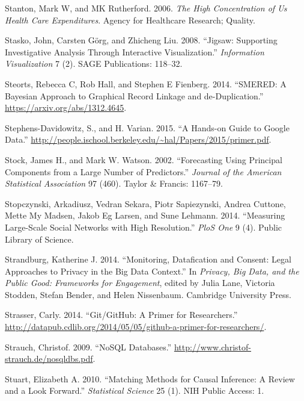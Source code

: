 \documentclass[]{krantz}
\begin{document}
\hypertarget{ref-stanton2006high}{}
Stanton, Mark W, and MK Rutherford. 2006. \emph{The High Concentration
of Us Health Care Expenditures}. Agency for Healthcare Research;
Quality.

\hypertarget{ref-stasko2008jigsaw}{}
Stasko, John, Carsten Görg, and Zhicheng Liu. 2008. ``Jigsaw: Supporting
Investigative Analysis Through Interactive Visualization.''
\emph{Information Visualization} 7 (2). SAGE Publications: 118--32.

\hypertarget{ref-steorts2014smered}{}
Steorts, Rebecca C, Rob Hall, and Stephen E Fienberg. 2014. ``SMERED: A
Bayesian Approach to Graphical Record Linkage and de-Duplication.''
\url{https://arxiv.org/abs/1312.4645}.

\hypertarget{ref-SDV2015}{}
Stephens-Davidowitz, S., and H. Varian. 2015. ``A Hands-on Guide to
Google Data.''
\url{http://people.ischool.berkeley.edu/~hal/Papers/2015/primer.pdf}.

\hypertarget{ref-stock2002forecasting}{}
Stock, James H., and Mark W. Watson. 2002. ``Forecasting Using Principal
Components from a Large Number of Predictors.'' \emph{Journal of the
American Statistical Association} 97 (460). Taylor \& Francis: 1167--79.

\hypertarget{ref-stopczynski2014}{}
Stopczynski, Arkadiusz, Vedran Sekara, Piotr Sapiezynski, Andrea
Cuttone, Mette My Madsen, Jakob Eg Larsen, and Sune Lehmann. 2014.
``Measuring Large-Scale Social Networks with High Resolution.''
\emph{PloS One} 9 (4). Public Library of Science.

\hypertarget{ref-Strandburg2014}{}
Strandburg, Katherine J. 2014. ``Monitoring, Datafication and Consent:
Legal Approaches to Privacy in the Big Data Context.'' In \emph{Privacy,
Big Data, and the Public Good: Frameworks for Engagement}, edited by
Julia Lane, Victoria Stodden, Stefan Bender, and Helen Nissenbaum.
Cambridge University Press.

\hypertarget{ref-GitResearch}{}
Strasser, Carly. 2014. ``Git/GitHub: A Primer for Researchers.''
\url{http://datapub.cdlib.org/2014/05/05/github-a-primer-for-researchers/}.

\hypertarget{ref-NoSQLdatabases}{}
Strauch, Christof. 2009. ``NoSQL Databases.''
\url{http://www.christof-strauch.de/nosqldbs.pdf}.

\hypertarget{ref-stuart2010matching}{}
Stuart, Elizabeth A. 2010. ``Matching Methods for Causal Inference: A
Review and a Look Forward.'' \emph{Statistical Science} 25 (1). NIH
Public Access: 1.
\end{document}
